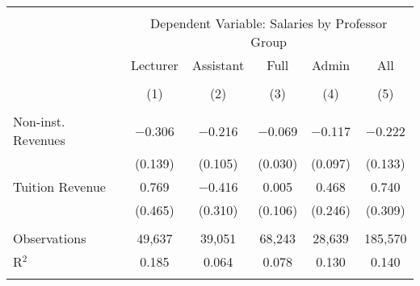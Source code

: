 
\begin{tabular}{@{\extracolsep{5pt}}lccccc} 
\\[-1.8ex]\hline 
\hline \\[-1.8ex] 
 & \multicolumn{5}{c}{Dependent Variable: Salaries by Professor Group} \\ 
\cline{2-6} 
 & Lecturer & Assistant & Full & Admin & All \\ 
\\[-1.8ex] & (1) & (2) & (3) & (4) & (5)\\ 
\hline \\[-1.8ex] 
 Non-inst. Revenues & $-$0.306 & $-$0.216 & $-$0.069 & $-$0.117 & $-$0.222 \\ 
  & (0.139) & (0.105) & (0.030) & (0.097) & (0.133) \\ 
  Tuition Revenue & 0.769 & $-$0.416 & 0.005 & 0.468 & 0.740 \\ 
  & (0.465) & (0.310) & (0.106) & (0.246) & (0.309) \\ 
 \hline \\[-1.8ex] 
Observations & 49,637 & 39,051 & 68,243 & 28,639 & 185,570 \\ 
R$^{2}$ & 0.185 & 0.064 & 0.078 & 0.130 & 0.140 \\ 
\hline 
\hline \\[-1.8ex] 
\end{tabular} 

